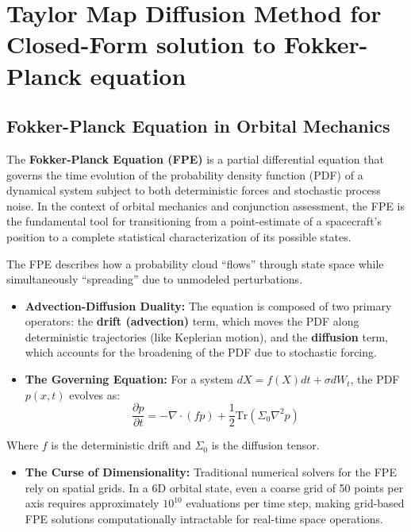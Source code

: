 \documentclass[
  letterpaper,
  DIV=11,
  numbers=noendperiod,
  oneside]{scrartcl}
\providecommand{\tightlist}{%
  \setlength{\itemsep}{0pt}\setlength{\parskip}{0pt}}
\begin{document}
\section{Taylor Map Diffusion Method for Closed-Form solution to
Fokker-Planck
equation}\label{taylor-map-diffusion-method-for-closed-form-solution-to-fokker-planck-equation}

\subsection{Fokker-Planck Equation in Orbital
Mechanics}\label{fokker-planck-equation-in-orbital-mechanics}

The \textbf{Fokker-Planck Equation (FPE)} is a partial differential
equation that governs the time evolution of the probability density
function (PDF) of a dynamical system subject to both deterministic
forces and stochastic process noise. In the context of orbital mechanics
and conjunction assessment, the FPE is the fundamental tool for
transitioning from a point-estimate of a spacecraft's position to a
complete statistical characterization of its possible states.

The FPE describes how a probability cloud ``flows'' through state space
while simultaneously ``spreading'' due to unmodeled perturbations.

\begin{itemize}
\item
  \textbf{Advection-Diffusion Duality:} The equation is composed of two
  primary operators: the \textbf{drift (advection)} term, which moves
  the PDF along deterministic trajectories (like Keplerian motion), and
  the \textbf{diffusion} term, which accounts for the broadening of the
  PDF due to stochastic forcing.
\item
  \textbf{The Governing Equation:} For a system
  \(dX = f(X)dt + \sigma dW_t\), the PDF \(p(x, t)\) evolves as: \[
  \frac{\partial p}{\partial t} = -\nabla \cdot (f p) + \frac{1}{2} \text{Tr}(\Sigma_0 \nabla^2 p)
  \]
\end{itemize}

Where \(f\) is the deterministic drift and \(\Sigma_0\) is the diffusion
tensor.

\begin{itemize}
\tightlist
\item
  \textbf{The Curse of Dimensionality:} Traditional numerical solvers
  for the FPE rely on spatial grids. In a 6D orbital state, even a
  coarse grid of 50 points per axis requires approximately \(10^{10}\)
  evaluations per time step, making grid-based FPE solutions
  computationally intractable for real-time space operations.
\end{itemize}
\end{document}

